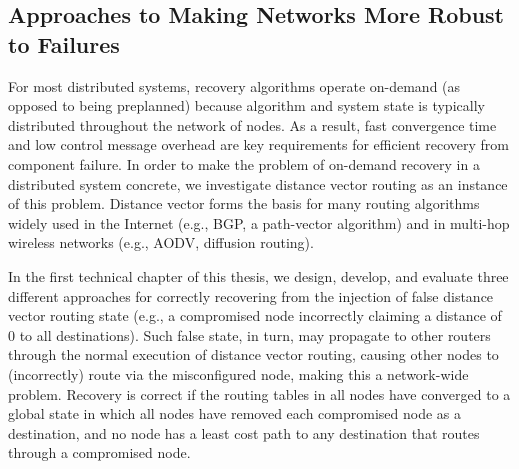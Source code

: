 \subsection{Approaches to Making Networks More Robust to Failures}



For most distributed systems, recovery algorithms operate on-demand (as opposed to being preplanned) because algorithm and system state is typically distributed throughout the network of nodes.  
As a result, fast convergence time and low control message overhead are key requirements for efficient recovery from component failure. 
In order to make the problem of on-demand recovery in a distributed system concrete, we investigate distance vector routing as an instance of this problem.
Distance vector forms the basis for many routing algorithms widely used in the Internet (e.g., BGP, a path-vector algorithm) and in multi-hop wireless networks (e.g., AODV, diffusion routing).

In the first technical chapter of this thesis, we design, develop, and evaluate three different approaches for correctly recovering from the injection of false distance vector routing state (e.g., a compromised node incorrectly
claiming a distance of $0$ to all destinations). Such false state, in turn, may propagate to other routers through the normal execution of distance vector routing, causing other nodes to (incorrectly) route via the misconfigured node,
making this a network-wide problem. Recovery is correct if the routing tables in all nodes have converged to a global state in which all nodes have removed each compromised node as a destination,
and no node has a least cost path to any destination that routes through a compromised node.  

